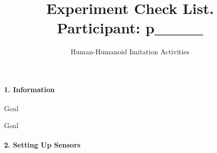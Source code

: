\documentclass[a4paper]{article}
\begin{document}
\title{\vspace{-4.0cm}Experiment Check List. Participant: p\_\_\_\_}
\author{Human-Humanoid Imitation Activities}
\date{}
\maketitle

\thispagestyle{empty} %



\paragraph{1. Information}

\begin{CheckList}{Goal}
\begin{minipage}[t]{0.5\textwidth}
\end{minipage}
\hspace{0.5cm}
\begin{minipage}[t]{0.5\textwidth}
\end{minipage}
\end{CheckList}


\vspace{-2mm}

\begin{CheckList}{Goal}
\begin{minipage}[t]{0.5\textwidth}
\end{minipage}
\hspace{0.5cm}
\begin{minipage}[t]{0.5\textwidth}
\end{minipage}
\end{CheckList}



\paragraph{2. Setting Up Sensors}


\hspace{2cm}
\end{document}
